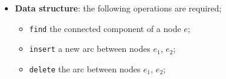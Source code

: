 \begin{frame}[fragile]{\secname}{\subsecname}
\begin{block}
\begin{itemize}
\begin{multicols}{2}
\tikzexternaldisable
\end{multicols}
\vspace{-.4cm}
\item<19-> \textbf{Data structure}: the following operations are required;
\begin{itemize}
\item<20-> \texttt{find} the connected component of a node $e$;
\item<21-> \texttt{insert} a new arc between nodes $e_1$, $e_2$;
\item<22-> \texttt{delete} the arc between nodes $e_1$, $e_2$;
\end{itemize}
\end{itemize}
\end{block}
\end{frame}

